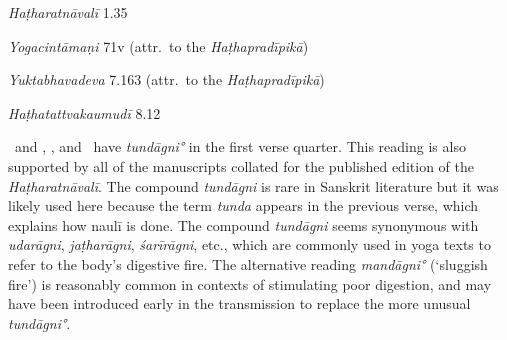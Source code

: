 \begin{ekdosis}
\begin{sources}[hp02_035]
\end{sources}

\begin{testimonia}[hp02_035]
\emph{Haṭharatnāvalī} 1.35

\begin{versinnote}
\end{versinnote}

\emph{Yogacintāmaṇi} 71v (attr.~to the \emph{Haṭhapradīpikā})

\begin{versinnote}
\end{versinnote}

\emph{Yuktabhavadeva} 7.163 (attr.~to the \emph{Haṭhapradīpikā})

\begin{versinnote}
\end{versinnote}

\emph{Haṭhatattvakaumudī} 8.12

\begin{versinnote}
\end{versinnote}


\end{testimonia}

\begin{philcomm}[hp02_035]
\alphaOne\ and \alphaTwo, \betaTwo, and \epsilonOne\ have \emph{tundāgni°} in the first verse quarter. This reading is also supported by all of the manuscripts collated for the published edition of the \emph{Haṭharatnāvalī}. The compound \emph{tundāgni} is rare in Sanskrit literature but it was likely used here because the term \emph{tunda} appears in the previous verse, which explains how naulī is done. The compound \emph{tundāgni} seems synonymous with \emph{udarāgni}, \emph{jaṭharāgni}, \emph{śarīrāgni}, etc., which are commonly used in yoga texts to refer to the body's digestive fire. The alternative reading \emph{mandāgni°} (`sluggish fire') is reasonably common in contexts of stimulating poor digestion, and may have been introduced early in the transmission to replace the more unusual \emph{tundāgni°}. 


\end{philcomm}
\end{ekdosis}
